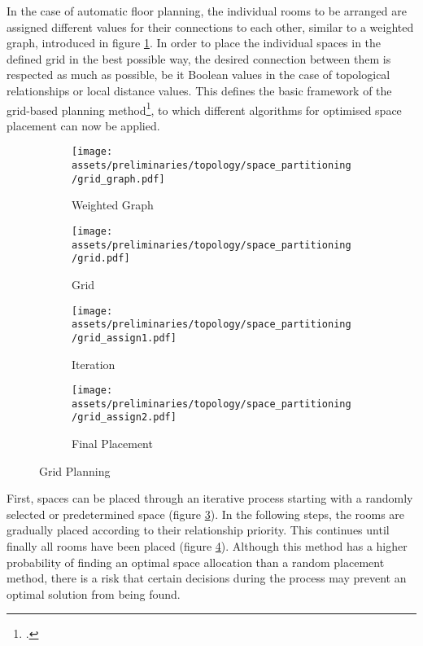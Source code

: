 \documentclass[a4paper, 12pt]{report}
\begin{document}
In the case of automatic floor planning, the individual rooms to be arranged are assigned different values for their connections to each other, similar to a weighted graph, introduced in figure \ref{fig:weighted-graph}. In order to place the individual spaces in the defined grid in the best possible way, the desired connection between them is respected as much as possible, be it Boolean values in the case of topological relationships or local distance values. This defines the basic framework of the grid-based planning method\footcite{lopes2010constrained}, to which different algorithms for optimised space placement can now be applied.

\begin{figure}
\centering
\begin{subfigure}{.25\textwidth}
\centering
\texttt{[image: assets/preliminaries/topology/space\_partitioning/grid\_graph.pdf]}
\caption{Weighted Graph}
\label{fig:weighted-graph}
\end{subfigure}%
\begin{subfigure}{.25\textwidth}
\centering
\texttt{[image: assets/preliminaries/topology/space\_partitioning/grid.pdf]}
\caption{Grid}
\label{fig:grid}
\end{subfigure}%
\begin{subfigure}{.25\textwidth}
\centering
\texttt{[image: assets/preliminaries/topology/space\_partitioning/grid\_assign1.pdf]}
\caption{Iteration}
\label{fig:iteration}
\end{subfigure}%
\begin{subfigure}{.25\textwidth}
\centering
\texttt{[image: assets/preliminaries/topology/space\_partitioning/grid\_assign2.pdf]}
\caption{Final Placement}
\label{fig:final-placement}
\end{subfigure}
\caption{Grid Planning}
\label{fig:grid-planning}
\end{figure}

First, spaces can be placed through an iterative process starting with a randomly selected or predetermined space (figure \ref{fig:iteration}). In the following steps, the rooms are gradually placed according to their relationship priority. This continues until finally all rooms have been placed (figure \ref{fig:final-placement}). Although this method has a higher probability of finding an optimal space allocation than a random placement method, there is a risk that certain decisions during the process may prevent an optimal solution from being found.
\end{document}

